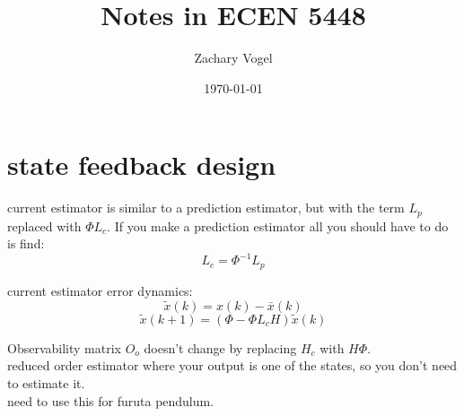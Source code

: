 \documentclass{article}
\author{Zachary Vogel}
\date{\today}
\title{Notes in ECEN 5448}
\begin{document}
\maketitle


\section*{state feedback design}
current estimator is similar to a prediction estimator, but with the term $L_p$ replaced with $\Phi L_c$. If you make a prediction estimator all you should have to do is find:
\[L_c=\Phi^{-1}L_p\]

current estimator error dynamics:
\[\tilde{x}(k)=x(k)-\bar{x}(k)\]
\[\tilde{x}(k+1)=(\Phi-\Phi L_cH)\tilde{x}(k)\]

Observability matrix $O_o$ doesn't change by replacing $H_c$ with $H\Phi$.\\
reduced order estimator where your output is one of the states, so you don't need to estimate it.\\
need to use this for furuta pendulum.\\
\end{document}
